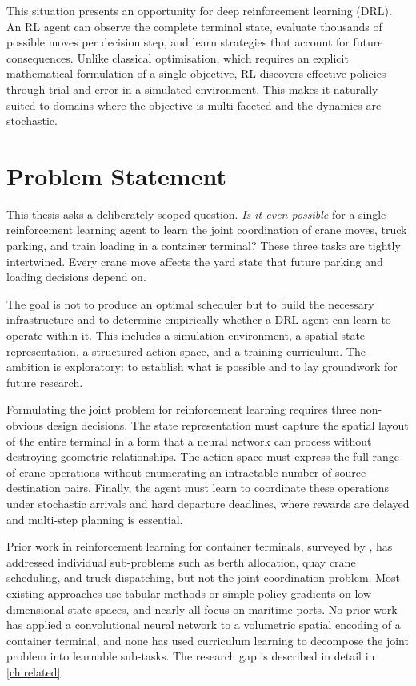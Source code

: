 \newpage
This situation presents an opportunity for deep reinforcement learning (DRL). An RL agent can observe the complete terminal state, evaluate thousands of possible moves per decision step, and learn strategies that account for future consequences. Unlike classical optimisation, which requires an explicit mathematical formulation of a single objective, RL discovers effective policies through trial and error in a simulated environment. This makes it naturally suited to domains where the objective is multi-faceted and the dynamics are stochastic.

\section{Problem Statement}
\label{sec:intro:problem}

This thesis asks a deliberately scoped question. \emph{Is it even possible} for a single reinforcement learning agent to learn the joint coordination of crane moves, truck parking, and train loading in a container terminal? These three tasks are tightly intertwined. Every crane move affects the yard state that future parking and loading decisions depend on.

The goal is not to produce an optimal scheduler but to build the necessary infrastructure and to determine empirically whether a DRL agent can learn to operate within it. This includes a simulation environment, a spatial state representation, a structured action space, and a training curriculum. The ambition is exploratory: to establish what is possible and to lay groundwork for future research.

Formulating the joint problem for reinforcement learning requires three non-obvious design decisions. The state representation must capture the spatial layout of the entire terminal in a form that a neural network can process without destroying geometric relationships. The action space must express the full range of crane operations without enumerating an intractable number of source--destination pairs. Finally, the agent must learn to coordinate these operations under stochastic arrivals and hard departure deadlines, where rewards are delayed and multi-step planning is essential.

Prior work in reinforcement learning for container terminals, surveyed by \textcite{colak2025rl}, has addressed individual sub-problems such as berth allocation, quay crane scheduling, and truck dispatching, but not the joint coordination problem. Most existing approaches use tabular methods or simple policy gradients on low-dimensional state spaces, and nearly all focus on maritime ports. No prior work has applied a convolutional neural network to a volumetric spatial encoding of a container terminal, and none has used curriculum learning to decompose the joint problem into learnable sub-tasks. The research gap is described in detail in \cref{ch:related}.
\newpage

